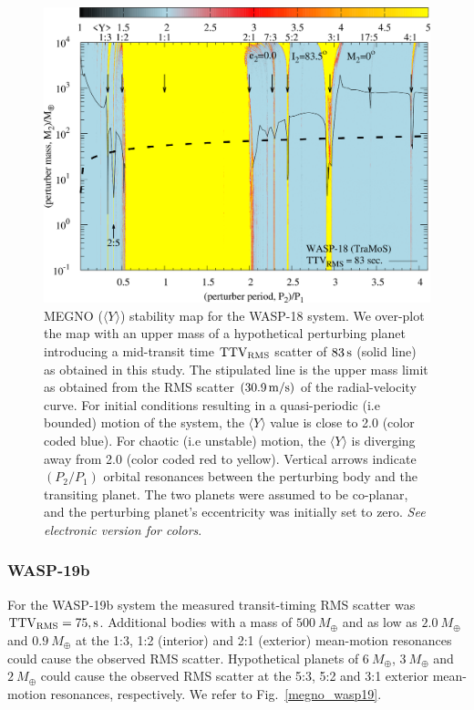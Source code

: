 \begin{figure}
\includegraphics[width=1.0\columnwidth]{imagenes/WASP18_TraMos_83sec_Map001_GIMP_scaled.png}
\caption{MEGNO ($\langle Y \rangle$) stability map for the WASP-18 system. We over-plot the map with an upper mass of a hypothetical perturbing planet introducing a mid-transit time $\rm TTV_{\rm RMS}$ scatter of $83\,{\rm s}$ (solid line) as obtained in this study. The stipulated line is the upper mass limit as obtained from the RMS scatter $(30.9\, \rm m/s)$ of the radial-velocity curve. For initial conditions resulting in a quasi-periodic (i.e bounded) motion of the system, the $\langle Y\rangle$ value is close to 2.0 (color coded blue). For chaotic (i.e unstable) motion, the $\langle Y \rangle$ is diverging away from 2.0 (color coded red to yellow). Vertical arrows indicate $(P_2/P_1)$ orbital resonances between the perturbing body and the transiting planet. The two planets were assumed to be co-planar, and the perturbing planet's eccentricity was initially set to zero.
\emph{See electronic version for colors}.}
\label{megno_wasp18}
\end{figure}


\subsubsection{WASP-19b}
For the WASP-19b system the measured transit-timing RMS scatter was $\rm TTV_{\rm RMS}=75,\rm s$. Additional bodies with a mass of $500~M_{\oplus}$ and as low as $2.0~M_{\oplus}$ and $0.9~M_{\oplus}$ at the 1:3, 1:2 (interior) and 2:1 (exterior) mean-motion resonances could cause the observed RMS scatter. Hypothetical planets of $6~M_{\oplus}$, $3~M_{\oplus}$ and $2~M_{\oplus}$ could cause the observed RMS scatter at the 5:3, 5:2 and 3:1 exterior mean-motion resonances, respectively. We refer to Fig.~\ref{megno_wasp19}.

